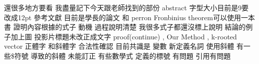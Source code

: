\documentclass{article}
\begin{document}
\theoremstyle{plain}
\newtheorem{thm}{Theorem}[section]
\newtheorem{cor}[thm]{Corollary}
\newtheorem{lem}[thm]{Lemma}
\newtheorem{prop}[thm]{Proposition}
\newtheorem{remark}[thm]{Remark}

\newtheorem{eg}[thm]{Example}
\newtheorem{conj}[thm]{Conjecture}

還很多地方要看 我盡量記下今天跟老師找到的部份
abstract 
字型大小目前是9要改成12pt
參考文獻 目前是學長的論文 和 perron Fronbinius theorem可以使用一本書
證明內容根據的式子 動機 過程說明清楚
我很多式子都還沒標上說明
結論的例子加上圖
投影片標題未改正成文字 proof(continue) , Our Method , k-rooted vector
正體字 和斜體字 合法性確認 目前共識是 變數 新定義名詞 使用斜體 
有一些\$符號 導致的斜體 未能訂正
有些數學式 定義的標號 有問題 引用有問題
\end{document}

